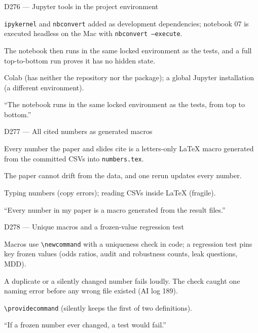 \documentclass[11pt,a4paper]{report}
\begin{document}
\begin{decisionbox}{D276 --- Jupyter tools in the project environment}
\begin{description}[nosep, leftmargin=0pt]
  \item[Decision.] \texttt{ipykernel} and \texttt{nbconvert} added as development dependencies; notebook 07 is executed headless on the Mac with \texttt{nbconvert --execute}.
  \item[Why.] The notebook then runs in the same locked environment as the tests, and a full top-to-bottom run proves it has no hidden state.
  \item[Alternatives.] Colab (has neither the repository nor the package); a global Jupyter installation (a different environment).
  \item[Interview line.] ``The notebook runs in the same locked environment as the tests, from top to bottom.''
\end{description}
\end{decisionbox}

\begin{decisionbox}{D277 --- All cited numbers as generated macros}
\begin{description}[nosep, leftmargin=0pt]
  \item[Decision.] Every number the paper and slides cite is a letters-only \LaTeX{} macro generated from the committed CSVs into \texttt{numbers.tex}.
  \item[Why.] The paper cannot drift from the data, and one rerun updates every number.
  \item[Alternatives.] Typing numbers (copy errors); reading CSVs inside \LaTeX{} (fragile).
  \item[Interview line.] ``Every number in my paper is a macro generated from the result files.''
\end{description}
\end{decisionbox}

\begin{decisionbox}{D278 --- Unique macros and a frozen-value regression test}
\begin{description}[nosep, leftmargin=0pt]
  \item[Decision.] Macros use \verb|\newcommand| with a uniqueness check in code; a regression test pins key frozen values (odds ratios, audit and robustness counts, leak questions, MDD).
  \item[Why.] A duplicate or a silently changed number fails loudly. The check caught one naming error before any wrong file existed (AI log 189).
  \item[Alternatives.] \verb|\providecommand| (silently keeps the first of two definitions).
  \item[Interview line.] ``If a frozen number ever changed, a test would fail.''
\end{description}
\end{decisionbox}
\end{document}

